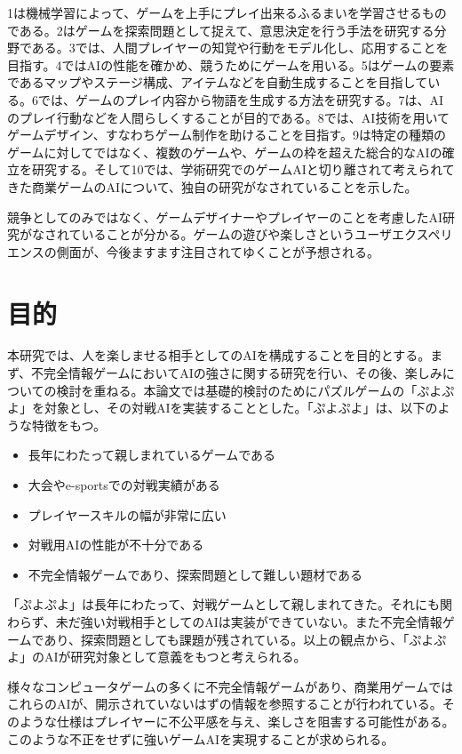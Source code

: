 \documentclass[12pt]{jreport}
\begin{document}
1は機械学習によって、ゲームを上手にプレイ出来るふるまいを学習させるものである。2はゲームを探索問題として捉えて、意思決定を行う手法を研究する分野である。3では、人間プレイヤーの知覚や行動をモデル化し、応用することを目指す。4ではAIの性能を確かめ、競うためにゲームを用いる。5はゲームの要素であるマップやステージ構成、アイテムなどを自動生成することを目指している。6では、ゲームのプレイ内容から物語を生成する方法を研究する。7は、AIのプレイ行動などを人間らしくすることが目的である。8では、AI技術を用いてゲームデザイン、すなわちゲーム制作を助けることを目指す。9は特定の種類のゲームに対してではなく、複数のゲームや、ゲームの枠を超えた総合的なAIの確立を研究する。そして10では、学術研究でのゲームAIと切り離されて考えられてきた商業ゲームのAIについて、独自の研究がなされていることを示した。

競争としてのみではなく、ゲームデザイナーやプレイヤーのことを考慮したAI研究がなされていることが分かる。ゲームの遊びや楽しさというユーザエクスペリエンスの側面が、今後ますます注目されてゆくことが予想される。


\section{目的}
本研究では、人を楽しませる相手としてのAIを構成することを目的とする。まず、不完全情報ゲームにおいてAIの強さに関する研究を行い、その後、楽しみについての検討を重ねる。本論文では基礎的検討のためにパズルゲームの「ぷよぷよ」を対象とし、その対戦AIを実装することとした。「ぷよぷよ」は、以下のような特徴をもつ。
\begin{itemize}
\item 長年にわたって親しまれているゲームである
\item 大会やe-sportsでの対戦実績がある
\item プレイヤースキルの幅が非常に広い
\item 対戦用AIの性能が不十分である
\item 不完全情報ゲームであり、探索問題として難しい題材である
\end{itemize}

「ぷよぷよ」は長年にわたって、対戦ゲームとして親しまれてきた。それにも関わらず、未だ強い対戦相手としてのAIは実装ができていない。また不完全情報ゲームであり、探索問題としても課題が残されている。以上の観点から、「ぷよぷよ」のAIが研究対象として意義をもつと考えられる。

様々なコンピュータゲームの多くに不完全情報ゲームがあり、商業用ゲームではこれらのAIが、開示されていないはずの情報を参照することが行われている\cite{yan_panorama}。そのような仕様はプレイヤーに不公平感を与え、楽しさを阻害する可能性がある。このような不正をせずに強いゲームAIを実現することが求められる。
\end{document}
